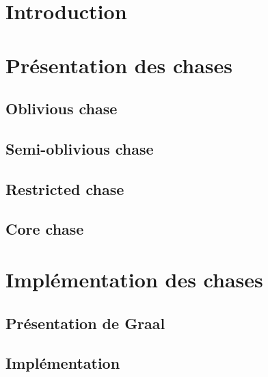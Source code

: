 \documentclass[utf8]{beamer}
\begin{document}
\maketitle


\section{Introduction}
    

\section{Présentation des chases}
    
    \subsection{Oblivious chase}
        
    \subsection{Semi-oblivious chase}
        
    \subsection{Restricted chase}
        
    \subsection{Core chase}
        
\section{Implémentation des chases}
    \subsection{Présentation de Graal}
        
    \subsection{Implémentation}
        
\end{document}
